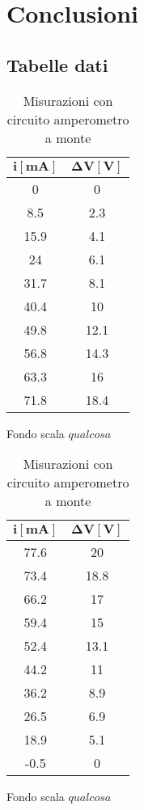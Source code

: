 \documentclass[12pt]{article}
\begin{document}
\section{Conclusioni}
\newpage
\begin{appendices}
\section{Tabelle dati}
\begin{table}[H]
\centering

  \begin{subtable}{.5\textwidth}
    \centering
    \begin{tabular}{|c|c|} \hline
     $\mathbf{i {[mA]}}$  & $\mathbf{\Delta V [V]}$  \\ \hline
      0 & 0  \\ \hline
      8.5 & 2.3  \\ \hline
      15.9 & 4.1  \\ \hline
      24 & 6.1  \\ \hline
      31.7 & 8.1  \\ \hline
      40.4 & 10  \\ \hline
      49.8 & 12.1  \\ \hline
      56.8 & 14.3  \\ \hline
      63.3 & 16  \\ \hline
      71.8 & 18.4  \\ \hline
    \end{tabular}
    \caption{Fondo scala $qualcosa$}
  \end{subtable}%
  \begin{subtable}{.5\textwidth}
  \centering
  \begin{tabular}{|c|c|} \hline
  $\mathbf{i {[mA]}}$  & $\mathbf{\Delta V [V]}$  \\ \hline
    77.6 & 20  \\ \hline
    73.4 & 18.8  \\ \hline
    66.2 & 17  \\ \hline
    59.4 & 15  \\ \hline
    52.4 & 13.1  \\ \hline
    44.2 & 11  \\ \hline
    36.2 & 8.9  \\ \hline
    26.5 & 6.9  \\ \hline
    18.9 & 5.1  \\ \hline
    -0.5 & 0  \\ \hline
  \end{tabular}
  \caption{Fondo scala $qualcosa$}
\end{subtable}
\caption{Misurazioni con circuito amperometro a monte}
\end{table}
\begin{table}[H]
\centering


\end{table}
\end{appendices}
\end{document}
